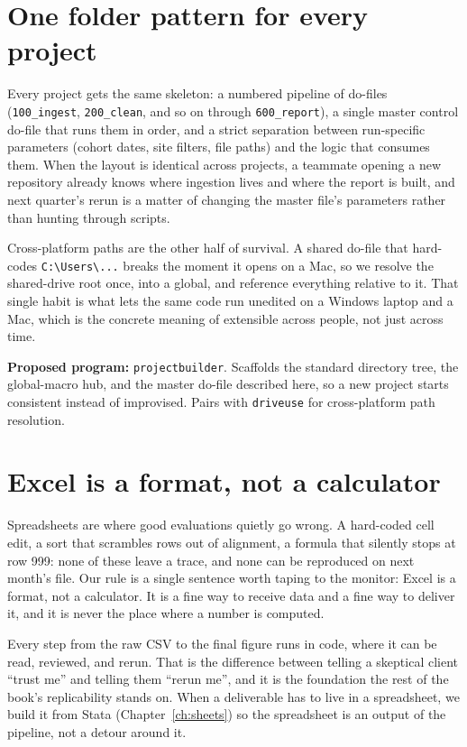\documentclass[
    a4paper,
    fontsize=10pt,
    twoside=true,
    numbers=noenddot,
]{kaobook}
\begin{document}
\section{One folder pattern for every project}
Every project gets the same skeleton: a numbered pipeline of do-files (\texttt{100\_ingest}, \texttt{200\_clean}, and so on through \texttt{600\_report}), a single master control do-file that runs them in order, and a strict separation between run-specific parameters (cohort dates, site filters, file paths) and the logic that consumes them. When the layout is identical across projects, a teammate opening a new repository already knows where ingestion lives and where the report is built, and next quarter's rerun is a matter of changing the master file's parameters rather than hunting through scripts.

Cross-platform paths are the other half of survival. A shared do-file that hard-codes \texttt{C:\textbackslash Users\textbackslash...} breaks the moment it opens on a Mac, so we resolve the shared-drive root once, into a global, and reference everything relative to it. That single habit is what lets the same code run unedited on a Windows laptop and a Mac, which is the concrete meaning of extensible across people, not just across time.

\begin{kaobox}[frametitle=Ado-file Idea: \texttt{projectbuilder}]
\textbf{Proposed program:} \texttt{projectbuilder}. Scaffolds the standard directory tree, the global-macro hub, and the master do-file described here, so a new project starts consistent instead of improvised. Pairs with \texttt{driveuse} for cross-platform path resolution.
\end{kaobox}

\section{Excel is a format, not a calculator}
Spreadsheets are where good evaluations quietly go wrong. A hard-coded cell edit, a sort that scrambles rows out of alignment, a formula that silently stops at row 999: none of these leave a trace, and none can be reproduced on next month's file. Our rule is a single sentence worth taping to the monitor: Excel is a format, not a calculator. It is a fine way to receive data and a fine way to deliver it, and it is never the place where a number is computed.

Every step from the raw CSV to the final figure runs in code, where it can be read, reviewed, and rerun. That is the difference between telling a skeptical client \enquote{trust me} and telling them \enquote{rerun me}, and it is the foundation the rest of the book's replicability stands on. When a deliverable has to live in a spreadsheet, we build it from Stata (Chapter~\ref{ch:sheets}) so the spreadsheet is an output of the pipeline, not a detour around it.
\end{document}
